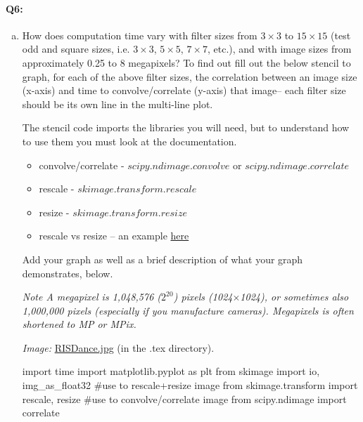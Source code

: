
\pagebreak
\paragraph{Q6:}
\begin{enumerate}[(a)]
    \item
    How does computation time vary with filter sizes from $3\times3$ to $15\times15$ (test odd and square sizes, i.e. $3\times3$, $5\times5$, $7\times7$, etc.), and with image sizes from approximately 0.25 to 8 megapixels? To find out fill out the below stencil to graph, for each of the above filter sizes, the correlation between an image size (x-axis) and time to convolve/correlate (y-axis) that image– each filter size should be its own line in the multi-line plot.

    The stencil code imports the libraries you will need, but to understand how to use them you must look at the documentation.
    \begin{itemize}
    \item convolve/correlate - \href{https://docs.scipy.org/doc/scipy/reference/generated/scipy.ndimage.convolve.html}{$scipy.ndimage.convolve$} or \href{https://docs.scipy.org/doc/scipy/reference/generated/scipy.ndimage.correlate.html}{$scipy.ndimage.correlate$}
    \item rescale - \href{https://scikit-image.org/docs/dev/api/skimage.transform.html#skimage.transform.rescale}{$skimage.transform.rescale$}
    \item resize - \href{https://scikit-image.org/docs/dev/api/skimage.transform.html#skimage.transform.resize}{$skimage.transform.resize$}
    \item rescale vs resize – an example \href{http://scikit-image.org/docs/dev/auto_examples/transform/plot_rescale.html}{here}
    \end{itemize}


    Add your graph as well as a brief description of what your graph demonstrates, below.

\emph{Note A megapixel is 1,048,576 ($2^{20}$) pixels (1024$\times$1024), or sometimes also 1,000,000 pixels (especially if you manufacture cameras). Megapixels is often shortened to MP or MPix.}

\emph{Image:} \href{RISDance.jpg}{RISDance.jpg} (in the .tex directory).

\begin{python}
import time
import matplotlib.pyplot as plt
from skimage import io, img_as_float32
#use to rescale+resize image
from skimage.transform import rescale, resize
#use to convolve/correlate image
from scipy.ndimage import correlate


\end{python}
\end{enumerate}
